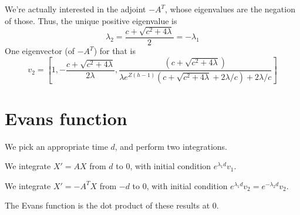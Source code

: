 \documentclass[10pt]{article}
\begin{document}
We're actually interested in the adjoint $-A^T$, whose eigenvalues are the negation of those.
Thus, the unique positive eigenvalue is
\[\lambda_2 = \frac{c + \sqrt{c^2 + 4 \lambda}}{2} = -\lambda_1 \]
One eigenvector (of $-A^T$) for that is
\[
v_2 = \left[1, -\frac{c + \sqrt{c^2 + 4 \lambda}}{2\lambda}, \frac{(c + \sqrt{c^2+4\lambda})}{\lambda e^{Z(h-1)}(c + \sqrt{c^2+4\lambda} + 2 \lambda/c)+ 2 \lambda / c}\right]
\]


\section{Evans function}
We pick an appropriate time $d$, and perform two integrations.

We integrate $X' = AX$ from $d$ to $0$, with initial condition $e^{\lambda_1 d}v_1$.

We integrate $X' = -A^T X$ from $-d$ to $0$, with initial condition $e^{\lambda_1 d}v_2 = e^{-\lambda_2 d}v_2$.

The Evans function is the dot product of these results at $0$.
\end{document}
